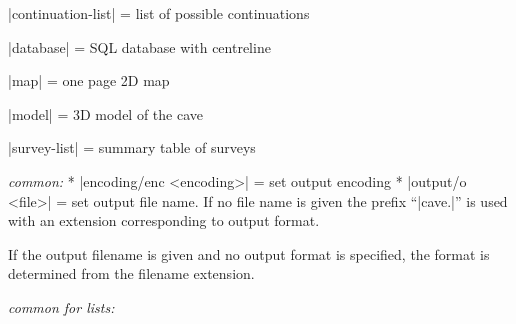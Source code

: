     |continuation-list| = list of possible continuations

    |database| = SQL database with centreline

    |map| = one page 2D map

    |model| = 3D model of the cave

    |survey-list| = summary table of surveys
\endarguments


\options
  {\it common:}\Nobreak
  * |encoding/enc <encoding>| = set output encoding
  * |output/o <file>| = set output file name. If no file name is
    given the prefix ``|cave.|'' is used with an extension corresponding to
    output format.

    If the output filename is given and no output format is specified,
    the format is determined from the filename extension.


  {\it common for lists:}\Nobreak

